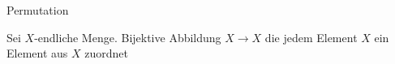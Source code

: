 \documentclass[class=article, crop=false]{standalone}
\begin{document}
\begin{zettel}{Permutation}
\begin{flashcard}[]{}
	Sei $X$-endliche Menge. Bijektive Abbildung $X \to  X$ die jedem Element $X$ ein Element aus $X$ zuordnet

\end{flashcard}
\end{zettel}
\end{document}
